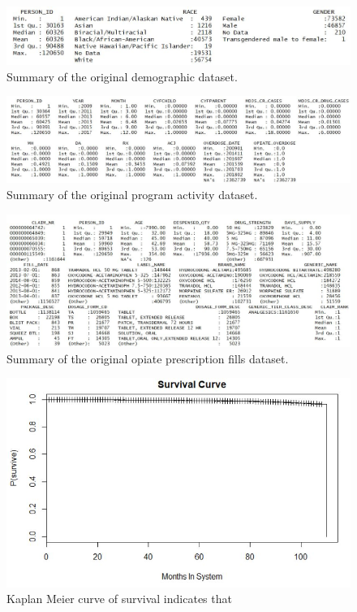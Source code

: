 \documentclass[twoside,10.5pt]{article}
\begin{document}
\begin{figure}
\begin{center}
\includegraphics[width=5in]{images/original_dem_summary.JPG}
\end{center}
\caption{Summary of the original demographic dataset.}
\label{fig:orig_dem}
\end{figure}

\begin{figure}
\begin{center}
\includegraphics[width=6in]{images/original_prog_summary.JPG}
\end{center}
\caption{Summary of the original program activity dataset.}
\label{fig:orig_prog}
\end{figure}

\begin{figure}
\begin{center}
\includegraphics[width=6in]{images/original_presc_summary.JPG}
\end{center}
\caption{Summary of the original opiate prescription fills dataset.}
\label{fig:orig_presc}
\end{figure}

\begin{figure}[htp]
\centering
\includegraphics[width=12cm]{images/kaplan_meier.JPG}
\caption{Kaplan Meier curve of survival indicates that }
\label{fig:km_original}
\end{figure}

\newpage
\theendnotes


\end{document}
